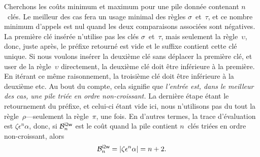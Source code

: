 
Cherchons les coûts minimum et maximum pour une pile donnée contenant
\(n\)~clés. Le meilleur des cas fera un usage minimal des règles
\(\sigma\)~et~\(\tau\), et ce nombre minimum d'appels est nul quand
les deux comparaisons associées sont négatives. La première clé
insérée n'utilise pas les clés \(\sigma\)~et~\(\tau\), mais seulement
la règle~\(\upsilon\), donc, juste après, le préfixe retourné est vide
et le suffixe contient cette clé unique. Si nous voulons insérer la
deuxième clé sans déplacer la première clé, et user de la
règle~\(\upsilon\) directement, la deuxième clé doit être inférieure à
la première. En itérant ce même raisonnement, la troisième clé doit
être inférieure à la deuxième etc. Au bout du compte, cela signifie
que \emph{l'entrée est, dans le meilleur des cas, une pile triée en
  ordre non-croissant.} La dernière étape étant le retournement du
préfixe, et celui-ci étant vide ici, nous n'utilisons pas du tout la
règle~\(\rho\)---seulement la règle~\(\pi\), une fois. En d'autres
termes, la trace d'évaluation est \(\zeta\epsilon^n\alpha\), donc, si
\(\B{\fun{i2w}}{n}\) est le coût quand la pile contient \(n\)~clés
triées en ordre non-croissant, alors
\begin{equation*}
\B{\fun{i2w}}{n} = \len{\zeta\epsilon^n\alpha} = n + 2.
\end{equation*}

